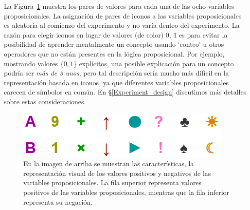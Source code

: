 La Figura~\ref{Figure:references} muestra los pares de valores para cada una de las ocho variables proposicionales. La asignación de pares de iconos a las variables proposicionales es aleatoria al comienzo del experimento y no varía dentro del experimento.
La razón para elegir iconos en lugar de valores (de color) 0, 1 es para evitar la posibilidad de aprender mentalmente un concepto usando `conteo' u otros operadores que no están presentes en la lógica proposicional. Por ejemplo, mostrando valores $ \{0,1 \} $ explícitos, una posible explicación para un concepto podría ser {\em más de 3 unos}, pero tal descripción sería mucho más difícil en la representación basada en iconos, ya que diferentes variables proposicionales carecen de símbolos en común. En \S\ref{Experiment_design} discutimos más detalles sobre estas consideraciones.

\begin{figure}[h!]
\begin{center}
    \includegraphics[scale=2]{../figuras/brm/Features8.png}
	\caption{
	En la imagen de arriba se muestran las características, la representación visual de los valores positivos y negativos de las variables proposicionales. La fila superior representa valores positivos de las variables proposicionales, mientras que la fila inferior representa su negación.}
	\label{Figure:references}
\end{center}
\end{figure}


